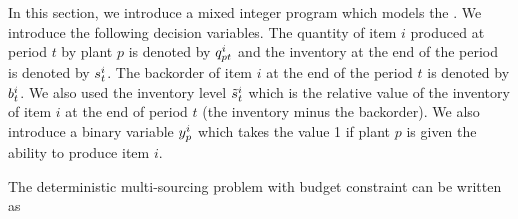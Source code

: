 In this section, we introduce a mixed integer program which models the \tbc.
We introduce the following decision variables.
The quantity of item $i$ produced at period $t$ by plant $p$ is denoted by $q_{pt}^i$ and the inventory at the end of the period is denoted by $s_t^i$.
The backorder of item $i$ at the end of the period $t$ is denoted by $b_t^i$.
We also used the inventory level $\tilde{s}_t^i$ which is the relative value of the inventory of item $i$ at the end of period $t$ (\ie the inventory minus the backorder).
We also introduce a binary variable $y_p^i$ which takes the value 1 if plant $p$ is given the ability to produce item $i$.


The deterministic multi-sourcing problem with budget constraint can be written as
